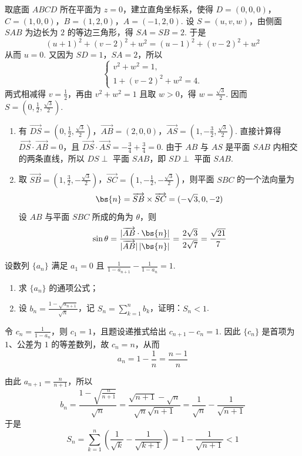 \begin{solution}
取底面 \(ABCD\) 所在平面为 \(z=0\)，建立直角坐标系，使得
\(D=(0,0,0)\)，\(C=(1,0,0)\)，\(B=(1,2,0)\)，\(A=(-1,2,0)\).
设 \(S=(u,v,w)\)，由侧面 \(SAB\) 为边长为 \(2\) 的等边三角形，得 \(SA=SB=2\). 于是
\[
(u+1)^2+(v-2)^2+w^2=(u-1)^2+(v-2)^2+w^2
\]
从而 \(u=0\). 又因为 \(SD=1\)，\(SA=2\)，所以
\[
\begin{cases}
v^2+w^2=1,\\
1+(v-2)^2+w^2=4.
\end{cases}
\]
两式相减得 \(v=\frac12\)，再由 \(v^2+w^2=1\) 且取 \(w>0\)，得 \(w=\frac{\sqrt{3}}2\). 因而 \(S=\left(0,\frac12,\frac{\sqrt{3}}2\right)\).

\begin{enumerate}
\item 有 \(\overrightarrow{DS}=\left(0,\frac12,\frac{\sqrt{3}}2\right)\)，\(\overrightarrow{AB}=(2,0,0)\)，\(\overrightarrow{AS}=\left(1,-\frac32,\frac{\sqrt{3}}2\right)\). 直接计算得 \(\overrightarrow{DS}\cdot\overrightarrow{AB}=0\)，且 \(\overrightarrow{DS}\cdot\overrightarrow{AS}=-\frac34+\frac34=0\). 由于 \(AB\) 与 \(AS\) 是平面 \(SAB\) 内相交的两条直线，所以 \(DS\perp\) 平面 \(SAB\)，即 \(SD\perp\) 平面 \(SAB\).

\item 取 \(\overrightarrow{SB}=\left(1,\frac32,-\frac{\sqrt{3}}2\right)\)，\(\overrightarrow{SC}=\left(1,-\frac12,-\frac{\sqrt{3}}2\right)\)，则平面 \(SBC\) 的一个法向量为
\[
\bs{n}=\overrightarrow{SB}\times\overrightarrow{SC}=(-\sqrt{3},0,-2)
\]
设 \(AB\) 与平面 \(SBC\) 所成的角为 \(\theta\)，则
\[
\sin\theta=\frac{|\overrightarrow{AB}\cdot\bs{n}|}{|\overrightarrow{AB}|\,|\bs{n}|}=\frac{2\sqrt{3}}{2\sqrt{7}}=\frac{\sqrt{21}}7
\]
\end{enumerate}
\end{solution}


\begin{problem}
设数列 \(\{a_{n}\}\) 满足 \(a_1 = 0\) 且 \(\frac{1}{1 - a_{n + 1}} -\frac{1}{1 - a_n} = 1\).
\begin{enumerate}
\item 求 \( \{a_{n}\} \) 的通项公式；
\item 设 \( b_n = \frac{1 - \sqrt{a_{n+1}}}{\sqrt{n}} \)，记 \( S_n = \sum_{k=1}^{n} b_k \)，证明：\( S_n < 1 \).
\end{enumerate}
\end{problem}

\begin{solution}
令 \(c_n=\frac{1}{1-a_n}\)，则 \(c_1=1\)，且题设递推式给出 \(c_{n+1}-c_n=1\). 因此 \(\{c_n\}\) 是首项为 \(1\)、公差为 \(1\) 的等差数列，故 \(c_n=n\)，从而
\[
a_n=1-\frac1n=\frac{n-1}{n}
\]

由此 \(a_{n+1}=\frac{n}{n+1}\)，所以
\[
b_n=\frac{1-\sqrt{\frac{n}{n+1}}}{\sqrt n}=\frac{\sqrt{n+1}-\sqrt n}{\sqrt n\sqrt{n+1}}=\frac1{\sqrt n}-\frac1{\sqrt{n+1}}
\]
于是
\[
S_n=\sum_{k=1}^n\left(\frac1{\sqrt k}-\frac1{\sqrt{k+1}}\right)=1-\frac1{\sqrt{n+1}}<1
\]
\end{solution}


